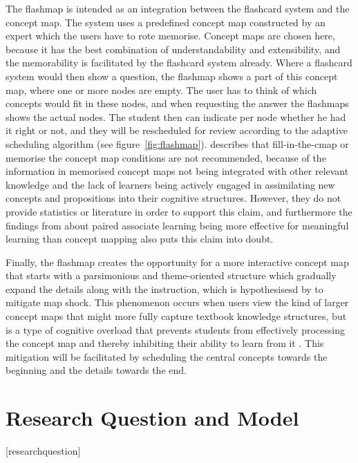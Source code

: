 The flashmap is intended as an integration between the flashcard system and the concept map. The system uses a predefined concept map constructed by an expert which the users have to rote memorise. Concept maps are chosen here, because it has the best combination of understandability and extensibility, and the memorability is facilitated by the flashcard system already. Where a flashcard system would then show a question, the flashmap shows a part of this concept map, where one or more nodes are empty. The user has to think of which concepts would fit in these nodes, and when requesting the answer the flashmaps shows the actual nodes. The student then can indicate per node whether he had it right or not, and they will be rescheduled for review according to the adaptive scheduling algorithm (see figure~\ref{fig:flashmap}).  describes that fill-in-the-cmap or memorise the concept map conditions are not recommended, because of the information in memorised concept maps not being integrated with other relevant knowledge and the lack of learners being actively engaged in assimilating new concepts and propositions into their cognitive structures. However, they do not provide statistics or literature in order to support this claim, and furthermore the findings from  about paired associate learning being more effective for meaningful learning than concept mapping also puts this claim into doubt.

Finally, the flashmap creates the opportunity for a more interactive concept map that starts with a parsimonious and theme-oriented structure which gradually expand the details along with the instruction, which is hypothesisesd by  to mitigate map shock. This phenomenon occurs when users view the kind of larger concept maps that might more fully capture textbook knowledge structures, but is a type of cognitive overload that prevents students from effectively processing the concept map and thereby inhibiting their ability to learn from it \cite{moore}. This mitigation will be facilitated by scheduling the central concepts towards the beginning and the details towards the end.

\section{Research Question and Model}
\renewcommand{\theresearchquestion}{\Roman{researchquestion}}
[researchquestion]
\renewcommand{\thesubquestion}{\alph{subquestion}}


